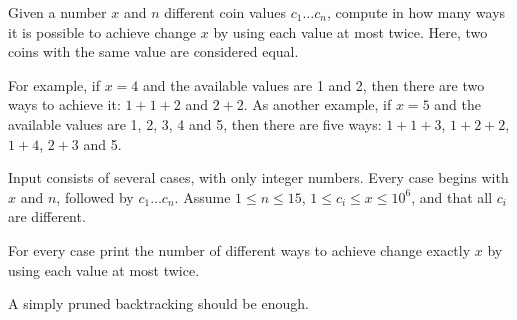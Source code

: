 

\Statement

Given a number $x$ and $n$ different coin values $c_1 \ldots c_n$,
compute in how many ways it is possible to achieve change $x$ by using each
value at most twice. Here, two coins with the same value are considered equal.

\medskip

For example, if $x = 4$ and the available values are 1 and 2, then
there are two ways to achieve it: $1 + 1 + 2$ and $2 + 2$.
As another example, if $x = 5$ and the available values are 1, 2, 3, 4 and 5,
then there are five ways:
$1 + 1 + 3$,
$1 + 2 + 2$,
$1 + 4$,
$2 + 3$
and 5.


\Input

Input consists of several cases, with only integer numbers.
Every case begins with $x$ and $n$,
followed by $c_1 \ldots c_n$.
Assume $1 \le n \le 15$,
$1 \le c_i \le x \le 10^6$,
and that all $c_i$ are different.


\Output

For every case print the number of different ways to achieve change exactly $x$
by using each value at most twice.


\Hint

A simply pruned backtracking should be enough.


\Sample


